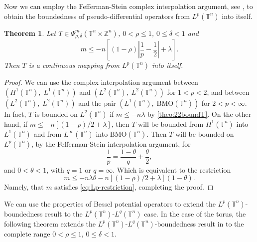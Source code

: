 \documentclass[12pt, reqno]{amsart}
\newtheorem{theorem}{Theorem}[section]
\theoremstyle{definition}
\theoremstyle{remark}
\numberwithin{equation}{section}
\begin{document}
Now we can employ the Fefferman-Stein complex interpolation argument, see \cite[pp.~159]{fefferman-stein}, to obtain the boundedness of pseudo-differential operators from $L^p(\mathbb{T}^n)$ into itself.
\begin{theorem}
    Let $T \in \Psi^m_{\rho, \delta}(\mathbb{T}^n \times \mathbb{Z}^n) $, $0 < \rho \leq 1$, $0 \leq \delta < 1$ and  
    \begin{equation}
    m \leq - n \left[(1-\rho)\left|\frac{1}{p} - \frac{1}{2}\right| + \lambda\right] .
    \label{eq:Lp-restriction}
    \end{equation} 
    Then $T$  is a continuous mapping from $L^p(\mathbb{T}^n)$ into itself.
    \label{theo:Lp-bounds}
\end{theorem}

\begin{proof}
    We can use the complex interpolation argument between $(H^1(\mathbb{T}^n),\; L^1(\mathbb{T}^n))$ and  $(L^2(\mathbb{T}^n),\; L^2(\mathbb{T}^n))$ for $1 < p < 2$, and between $(L^2(\mathbb{T}^n),\; L^2(\mathbb{T}^n))$ and the pair $(L^1(\mathbb{T}^n),\; \mathrm{BMO}(\mathbb{T}^n))$ for $2 < p<\infty$. In fact, $T$ is bounded on $L^2(\mathbb{T}^n)$ if $m\leq -n\lambda$ by \cref{theo:22boundT}. On the other hand, if $m\leq -n[(1-\rho)/2 + \lambda]$, then $T$ will be bounded from $H^1(\mathbb{T}^n)$ into $L^1(\mathbb{T}^n)$ and from $L^\infty(\mathbb{T}^n)$ into $\mathrm{BMO}(\mathbb{T}^n)$. Then $T$ will be bounded on $L^p(\mathbb{T}^n)$, by the Fefferman-Stein interpolation argument, for
    \begin{equation*}
        \frac{1}{p} = \frac{1-\theta}{q} + \frac{\theta}{2},
    \end{equation*}
    and $0<\theta<1$, with $q=1$ or $q=\infty$. Which is equivalent to the restriction 
    \begin{equation*}
        m \leq -n\lambda\theta - n\left[(1-\rho)/2 +\lambda\right](1 - \theta).
    \end{equation*}
    Namely, that $m$ satisfies \cref{eq:Lp-restriction}, completing the proof.
\end{proof}
We can use the properties of Bessel potential operators to extend the $L^p(\mathbb{T}^n)$-boundedness result to the $L^p(\mathbb{T}^n)$-$L^q(\mathbb{T}^n)$ case. In the case of the torus, the following theorem extends the $L^p(\mathbb{T}^n)$-$L^q(\mathbb{T}^n)$-boundedness result in  \cite{cardona-delgado-kumar} to the complete range $0 < \rho \leq 1$, $0 \leq \delta < 1$.
\end{document}
